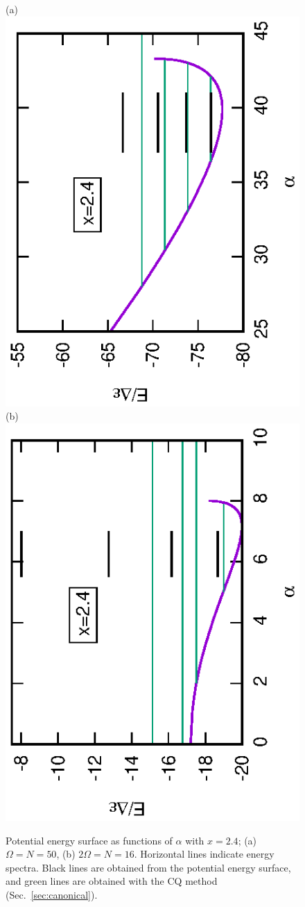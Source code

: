 \documentclass[11pt]{book} %
\begin{document}
\begin{figure}[tb]
 \begin{center}
(a) \includegraphics[height=0.4\textwidth,angle=-90]{images/N50Xeq2p4gap_E.eps}
(b) \includegraphics[height=0.4\textwidth,angle=-90]{images/N16Xeq2p4gap_E.eps}
 \end{center}
\caption{Potential energy surface as functions of $\alpha$ with $x=2.4$;
(a) $\Omega=N=50$,
(b) $2\Omega=N=16$.
Horizontal lines 
indicate energy spectra. Black lines are obtained
from the potential energy surface, and green lines are 
obtained with the CQ method
(Sec.~\ref{sec:canonical}).
}
 \label{fig:Delta_E}
\end{figure}
\end{document}

